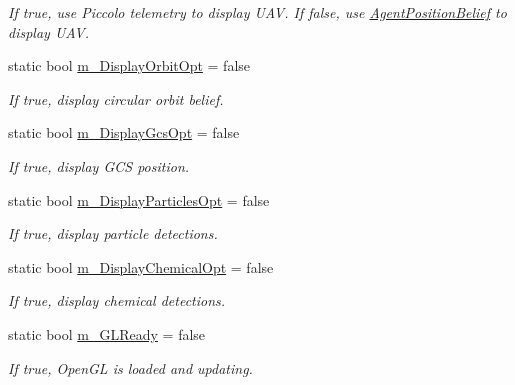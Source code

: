 \begin{DoxyCompactItemize}
\begin{DoxyCompactList}\small\item\em If true, use Piccolo telemetry to display UAV. If false, use \hyperlink{class_agent_position_belief}{AgentPositionBelief} to display UAV. \end{DoxyCompactList}\item 
\hypertarget{class_viewer3_d_a0961798e265c72156f70aa21a24a168d}{
static bool \hyperlink{class_viewer3_d_a0961798e265c72156f70aa21a24a168d}{m\_\-DisplayOrbitOpt} = false}
\label{class_viewer3_d_a0961798e265c72156f70aa21a24a168d}

\begin{DoxyCompactList}\small\item\em If true, display circular orbit belief. \end{DoxyCompactList}\item 
\hypertarget{class_viewer3_d_af180f0cde57510a0859caab442c5fa03}{
static bool \hyperlink{class_viewer3_d_af180f0cde57510a0859caab442c5fa03}{m\_\-DisplayGcsOpt} = false}
\label{class_viewer3_d_af180f0cde57510a0859caab442c5fa03}

\begin{DoxyCompactList}\small\item\em If true, display GCS position. \end{DoxyCompactList}\item 
\hypertarget{class_viewer3_d_a3271ab86cdcaa6d1269c538587f6b159}{
static bool \hyperlink{class_viewer3_d_a3271ab86cdcaa6d1269c538587f6b159}{m\_\-DisplayParticlesOpt} = false}
\label{class_viewer3_d_a3271ab86cdcaa6d1269c538587f6b159}

\begin{DoxyCompactList}\small\item\em If true, display particle detections. \end{DoxyCompactList}\item 
\hypertarget{class_viewer3_d_a19bf1077627b22361222089ddfd06f2b}{
static bool \hyperlink{class_viewer3_d_a19bf1077627b22361222089ddfd06f2b}{m\_\-DisplayChemicalOpt} = false}
\label{class_viewer3_d_a19bf1077627b22361222089ddfd06f2b}

\begin{DoxyCompactList}\small\item\em If true, display chemical detections. \end{DoxyCompactList}\item 
\hypertarget{class_viewer3_d_af9d4fc73c210639534d9489bc0ce898c}{
static bool \hyperlink{class_viewer3_d_af9d4fc73c210639534d9489bc0ce898c}{m\_\-GLReady} = false}
\label{class_viewer3_d_af9d4fc73c210639534d9489bc0ce898c}

\begin{DoxyCompactList}\small\item\em If true, OpenGL is loaded and updating. \end{DoxyCompactList}\end{DoxyCompactItemize}
